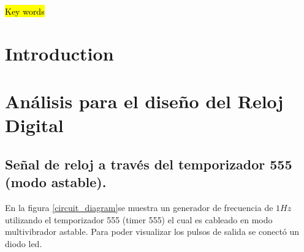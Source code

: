 \begin{IEEEkeywords}
\hl{Key words}
\end{IEEEkeywords}

\IEEEpeerreviewmaketitle

\section{Introduction}

\section{Análisis para el diseño del Reloj Digital}
\subsection{Señal de reloj a través del temporizador 555 (modo astable).}
En la figura \ref{circuit_diagram}se muestra un generador de frecuencia de $1Hz$ utilizando el temporizador 555 (timer 555) el cual es cableado en modo multivibrador astable. Para poder visualizar los pulsos de salida se conectó un diodo led.


